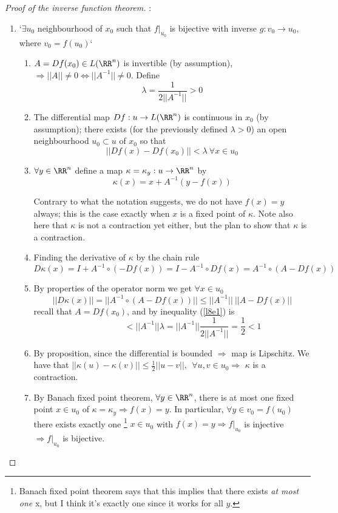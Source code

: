 \begin{proof}[Proof of the inverse function theorem]
  \par:
  \begin{enumerate}[I]
  \item `$\exists u_0$ neighbourhood of $x_0$ such that $f|_{u_0}$ is bijective with inverse $g: v_0 \rightarrow u_0$, where $v_0 = f(u_0)$`
    \begin{enumerate}
    \item $A = Df(x_0) \in L(\RR^n)$ is invertible (by assumption), $\Rightarrow ||A|| \neq 0 \Leftrightarrow ||A^{-1}|| \neq 0$. Define
      $$\lambda = \frac{1}{2||A^{-1}||} > 0$$
    \item The differential map $Df: u \rightarrow L(\RR^n)$ is continuous in $x_0$ (by assumption); there exists (for the previously defined $\lambda > 0$) an open neighbourhood $u_0 \subset u$ of $x_0$ so that
      \begin{equation}
        \label{l8e1}
        ||Df(x) - Df(x_0)|| < \lambda \: \forall x \in u_0
        \end{equation}
    \item $\forall y \in \RR^n$ define a map $\kappa = \kappa_y: u \rightarrow \RR^n$ by
      \begin{equation}
        \label{l8e2}
        \kappa(x) = x + A^{-1}(y - f(x))
      \end{equation}
      \begin{rem}
        Contrary to what the notation suggests, we do not have $f(x) = y$ always; this is the case exactly when $x$ is a fixed point of $\kappa$. Note also here that $\kappa$ is not a contraction yet either, but the plan to show that $\kappa$ is a contraction.
      \end{rem}
    \item Finding the derivative of $\kappa$ by the chain rule
      $$D\kappa(x) = I + A^{-1}\circ(-Df(x)) = I - A^{-1}\circ Df(x) = A^{-1} \circ(A-Df(x))$$
    \item By properties of the operator norm we get $\forall x \in u_0$
      $$||D\kappa(x)|| = ||A^{-1} \circ(A-Df(x))|| \leq ||A^{-1}||\:||A-Df(x)||$$
      recall that $A = Df(x_0)$, and by inequality (\ref{l8e1}) is
      $$\phantom{||D\kappa(x)||} < ||A^{-1}||\lambda = ||A^{-1}||\frac{1}{2||A^{-1}||}=\frac{1}{2} < 1$$
    \item By proposition, since the differential is bounded $\Rightarrow$ map is Lipschitz. We have that $||\kappa(u) - \kappa(v)|| \leq \frac{1}{2}||u-v||, \:\:\forall u,v \in u_0 \Rightarrow $ $\kappa$ is a contraction.
    \item By Banach fixed point theorem, $\forall y \in \RR^n$, there is at most one fixed point $x\in u_0$ of $\kappa = \kappa_y \Rightarrow f(x) = y$. In particular, $\forall y \in v_0 = f(u_0)$ there exists exactly one \footnote{Banach fixed point theorem says that this implies that there exists \emph{at most one} x, but I think it's exactly one since it works for all $y$.} $x \in u_0$ with $f(x) = y \Rightarrow f|_{u_0}$ is injective $\Rightarrow f|_{u_0}$ is bijective.
    \end{enumerate}
    

\end{enumerate}
\end{proof}
